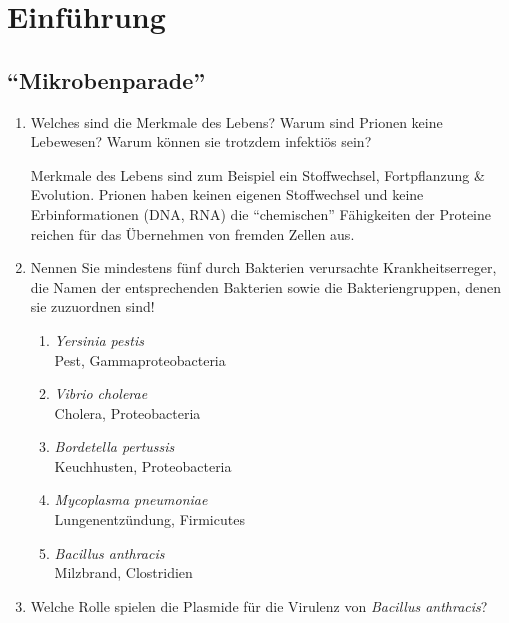 \section{Einführung}
\subsection{``Mikrobenparade''}
\begin{enumerate}
	\item Welches sind die Merkmale des Lebens? Warum sind Prionen keine Lebewesen? Warum können sie trotzdem infektiös sein? \hfill \vspace{4mm}

	Merkmale des Lebens sind zum Beispiel ein Stoffwechsel, Fortpflanzung \& Evolution.
	Prionen haben keinen eigenen Stoffwechsel und keine Erbinformationen (DNA, RNA)
	die ``chemischen'' Fähigkeiten der Proteine reichen für das Übernehmen von fremden Zellen aus.
	



	\item Nennen Sie mindestens fünf durch Bakterien verursachte Krankheitserreger, die Namen der entsprechenden Bakterien sowie die Bakteriengruppen, denen sie zuzuordnen sind!
		\label{item:boesebakterien}
	\begin{enumerate}[label=\arabic*)]
		\item \emph{Yersinia pestis} \hfill \\
			Pest, Gammaproteobacteria
		\item \emph{Vibrio cholerae} \hfill \\
			Cholera, Proteobacteria
		\item \emph{Bordetella pertussis} \hfill \\
			Keuchhusten, Proteobacteria
		\item \emph{Mycoplasma pneumoniae} \hfill \\
			Lungenentzündung, Firmicutes
		\item \emph{Bacillus anthracis} \hfill \\
			Milzbrand, Clostridien
	\end{enumerate}


	\item Welche Rolle spielen die Plasmide für die Virulenz von \emph{Bacillus anthracis}?  \hfill \vspace{0.2mm} \\


\end{enumerate}
